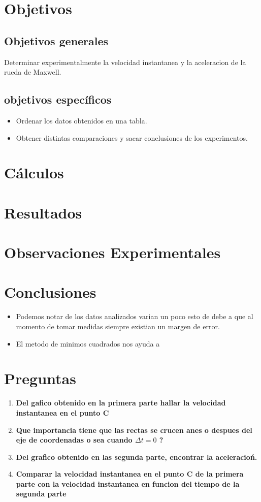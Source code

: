 \section{Objetivos}
\subsection{Objetivos generales}
Determinar experimentalmente la velocidad instantanea y la aceleracion de la rueda de Maxwell.
\subsection{objetivos espec\'ificos}
\begin{itemize}
    \item Ordenar los datos obtenidos en una tabla.
    \item Obtener distintas comparaciones y sacar conclusiones de los experimentos.
\end{itemize}
\section{C\'alculos}
\section{Resultados}
\section{Observaciones Experimentales}
\section{Conclusiones}
\begin{itemize}
    \item Podemos notar de los datos analizados varian un poco esto de debe a que al momento de tomar medidas siempre existian un margen de error.
    \item El metodo de minimos cuadrados nos ayuda a 
\end{itemize}
\section{Preguntas}
\begin{enumerate}
    \item \textbf{Del gafico obtenido en la primera parte hallar la velocidad instantanea en el punto C}
    \item \textbf{Que importancia tiene que las rectas se crucen anes o despues del eje de coordenadas o sea cuando $\Delta t=0$  ?}
    \item \textbf{Del grafico obtenido en las segunda parte, encontrar la aceleracio\'n.}
    \item \textbf{Comparar la velocidad instantanea en el punto C de la primera parte con la velocidad instantanea en funcion del tiempo de la segunda parte}
\end{enumerate}
